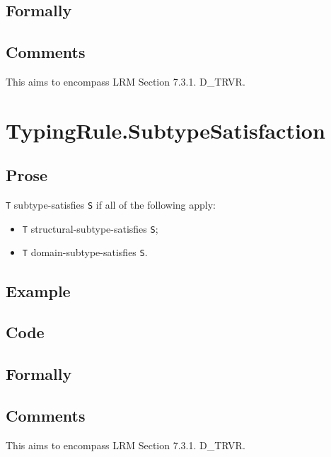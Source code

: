 \documentclass{book}
\begin{document}
\begin{emptyformal}
    \subsection{Formally}
\end{emptyformal}

\subsection{Comments}
    This aims to encompass LRM Section 7.3.1. D\_TRVR.

\section{TypingRule.SubtypeSatisfaction}

  \subsection{Prose}
    \texttt{T} subtype-satisfies \texttt{S} if all of the following apply:
    \begin{itemize}
    \item \texttt{T} structural-subtype-satisfies \texttt{S};
    \item \texttt{T} domain-subtype-satisfies \texttt{S}.
    \end{itemize} 

  \subsection{Example}

  \subsection{Code}

\begin{emptyformal}
    \subsection{Formally}
\end{emptyformal}

\subsection{Comments}
    This aims to encompass LRM Section 7.3.1. D\_TRVR.
\end{document}
